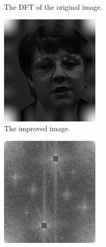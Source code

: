 \begin{figure}[H]
\begin{subfigure}{.4\textwidth}
    \caption{The DFT of the original image.}
    \label{fig:blurry_fft}
\end{subfigure}
\begin{subfigure}{.4\textwidth}
    \centering
    \includegraphics[width=\linewidth]{figures/improved_face.png}
    \caption{The improved image.}
    \label{fig:improved_face}
\end{subfigure}
\begin{subfigure}{.4\textwidth}
    \centering
    \includegraphics[width=\linewidth]{figures/covered_fft.png}

\end{subfigure}
\end{figure}
